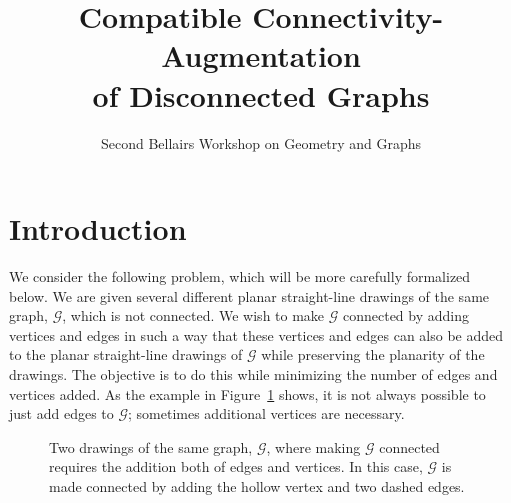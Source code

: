 \documentclass[a4paper, 11pt]{article}
\begin{document}
\title{Compatible Connectivity-Augmentation \\ of Disconnected Graphs}





\author{Second Bellairs Workshop on Geometry and Graphs}
\date{}

\maketitle
\begin{abstract}

\end{abstract}



\section{Introduction}


We consider the following problem, which will be more carefully formalized
below.  We are given several different planar straight-line drawings
of the same graph, $\mathcal G$, which is not connected.
We wish to make $\mathcal G$ connected by adding vertices and edges in
such a way that these vertices and edges can also be added to the planar
straight-line drawings of $\mathcal G$ while preserving the planarity of
the drawings.  The objective is to do this while minimizing the number
of edges and vertices added.  As the example in Figure~\ref{fig:bad-example} shows, it is not always possible to just add edges to $\mathcal G$; sometimes additional vertices are necessary.

\begin{figure}
  \caption{Two drawings of the same graph, $\mathcal{G}$, where making $\mathcal{G}$ connected requires the addition both of edges and vertices. In this case, $\mathcal G$ is made connected by adding the hollow vertex and two dashed edges.}
  \label{fig:bad-example}
\end{figure}
\end{document}
